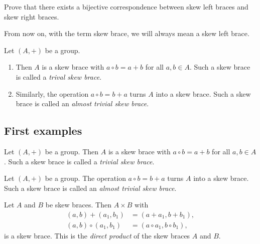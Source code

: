    \begin{exercise}
        Prove that there exists a bijective correspondence between skew left braces
        and skew right braces.
   \end{exercise}

    \begin{convention}
        From now on, with the term skew brace, we will always mean a skew left brace.
    \end{convention}

    \begin{examples}
        Let $(A,+)$ be a group. 
        \begin{enumerate}
            \item Then $A$ is a skew brace with
            $a\circ b=a+b$ for all $a,b\in A$. Such a skew brace is called a \emph{trival skew brace}.
            \item Similarly, the operation $a\circ b=b+a$ turns $A$ into a skew brace. Such a skew brace is called an \emph{almost trivial skew brace}. 
        \end{enumerate}
    \end{examples}

    \subsection{First examples}

    \begin{example}
        Let $(A,+)$ be a group. Then $A$ is a skew brace with
            $a\circ b=a+b$ for all $a,b\in A$. Such a skew brace is called a \emph{trivial skew brace}.
    \end{example}
    
    \begin{example}
          Let $(A,+)$ be a group. The operation $a\circ b=b+a$ turns $A$ into a skew brace. Such a skew brace is called an \emph{almost trivial skew brace}. 
    \end{example}

    \begin{definition}
        Let $A$ and $B$ be skew braces. Then $A\times B$ with 
    	\begin{align*}
    		(a,b)+(a_1,b_1)&=(a+a_1,b+b_1),\\
    		(a,b)\circ (a_1,b_1)&=(a\circ a_1,b\circ b_1),
    	\end{align*}
    	is a skew brace. This is the \emph{direct product} of the skew braces $A$ and $B$. 
    \end{definition}
    
